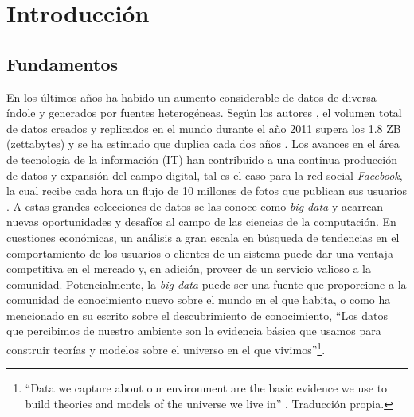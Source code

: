 \chapter{Introducción}

\section{Fundamentos}

En los últimos años ha habido un aumento considerable de datos de diversa índole
y generados por fuentes heterogéneas. Según los autores
\citeauthor{gantz_extracting_2011}, el volumen total de datos creados y
replicados en el mundo durante el año 2011 supera los 1.8 ZB (zettabytes) y se
ha estimado que duplica cada dos años \cite{gantz_extracting_2011}. Los avances
en el área de tecnología de la información (IT) han contribuido a una continua
producción de datos y expansión del campo digital, tal es el caso para la red
social \textit{Facebook}, la cual recibe cada hora un flujo de 10 millones de
fotos que publican sus usuarios \cite{mayer-schonberger_big_2013}. A estas
grandes colecciones de datos se las conoce como \textit{big data} y acarrean
nuevas oportunidades y desafíos al campo de las ciencias de la computación. En
cuestiones económicas, un análisis a gran escala en búsqueda de tendencias en el
comportamiento de los usuarios o clientes de un sistema puede dar una ventaja
competitiva en el mercado y, en adición, proveer de un servicio valioso a la
comunidad. Potencialmente, la \textit{big data} puede ser una fuente que
proporcione a la comunidad de conocimiento nuevo sobre el mundo en el que
habita, o como ha mencionado \citeauthor{fayyad_advances_1996} en su escrito
sobre el descubrimiento de conocimiento, “Los datos que percibimos de nuestro
ambiente son la evidencia básica que usamos para construir teorías y modelos
sobre el universo en el que vivimos”\footnote{“Data we capture about our
   environment are the basic evidence we use to build theories and models of the
universe we live in” \cite[p. 2]{fayyad_advances_1996}. Traducción propia.}.

